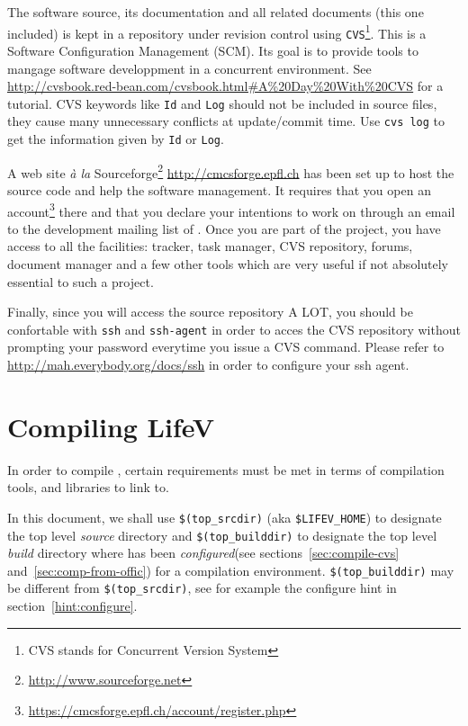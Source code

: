 The software source, its documentation and all related documents (this
one included) is kept in a repository under revision control
using \verb!CVS!\footnote{CVS stands for Concurrent Version System}. This is a Software Configuration Management (SCM). Its goal
is to provide tools to mangage software developpment in a concurrent environment.
See \url{http://cvsbook.red-bean.com/cvsbook.html#A%20Day%20With%20CVS}
for a tutorial. CVS keywords like \verb!Id! and \verb!Log! should not be included in source files,
they cause many unnecessary conflicts at update/commit time. Use
\verb!cvs log! to get the information given by \verb!Id! or \verb!Log!.

A web site {\it\`a la} Sourceforge\footnote{\url{http://www.sourceforge.net}} \url{http://cmcsforge.epfl.ch} has been set up to host the source code and help the software management.
It requires that you open an account\footnote{\url{https://cmcsforge.epfl.ch/account/register.php}} there and that you declare your intentions to work on \lifev through an email to the development mailing list of \lifev.
Once you are part of the project, you have access to all the facilities: tracker, task manager, CVS repository, forums, document manager and a few other tools which are very useful if not absolutely essential to such a project.

Finally, since you will access the source repository A LOT, you should be confortable
with \verb!ssh!  and \verb!ssh-agent!
in order to acces the CVS repository without prompting your password everytime you issue
a CVS command. Please refer to \url{http://mah.everybody.org/docs/ssh} in order to configure
your ssh agent.

\section{Compiling LifeV}
\label{compile-lifev}

In order to compile \lifev, certain requirements must be met in terms
of compilation tools, and libraries to link to.

\noindent In this document, we shall use \verb+$(top_srcdir)+ (aka \verb+$LIFEV_HOME+) to designate the top level \emph{source} directory
and \verb+$(top_builddir)+ to designate the top level \emph{build}
directory where \lifev has been \emph{configured}(see
sections~\ref{sec:compile-cvs} and~\ref{sec:comp-from-offic}) for a
compilation environment.  \verb+$(top_builddir)+ may be different from
\verb+$(top_srcdir)+, see for example the configure hint in
section~\ref{hint:configure}.

